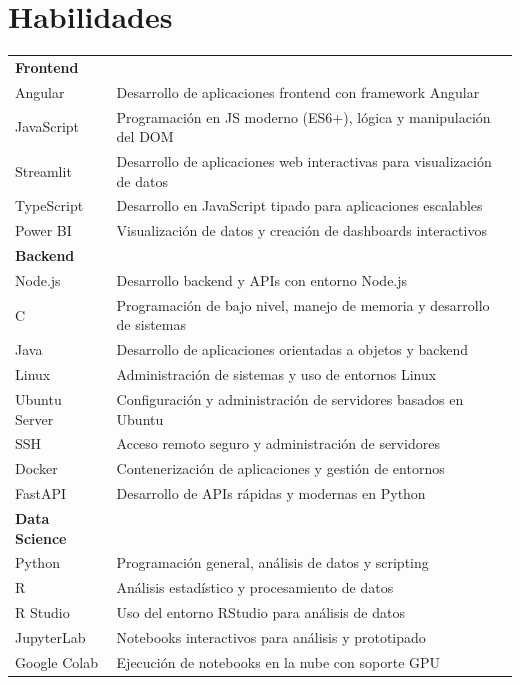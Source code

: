 \documentclass[a4paper,12pt]{article}
\begin{document}
\section{Habilidades}
\begin{tabularx}{\linewidth}{@{}l X@{}}

\textbf{Frontend} \\
Angular & \normalsize{Desarrollo de aplicaciones frontend con framework Angular}\\
JavaScript & \normalsize{Programación en JS moderno (ES6+), lógica y manipulación del DOM}\\
Streamlit & \normalsize{Desarrollo de aplicaciones web interactivas para visualización de datos}\\
TypeScript & \normalsize{Desarrollo en JavaScript tipado para aplicaciones escalables}\\
Power BI & \normalsize{Visualización de datos y creación de dashboards interactivos}\\

\textbf{Backend} \\
Node.js & \normalsize{Desarrollo backend y APIs con entorno Node.js}\\
C & \normalsize{Programación de bajo nivel, manejo de memoria y desarrollo de sistemas}\\
Java & \normalsize{Desarrollo de aplicaciones orientadas a objetos y backend}\\
Linux & \normalsize{Administración de sistemas y uso de entornos Linux}\\
Ubuntu Server & \normalsize{Configuración y administración de servidores basados en Ubuntu}\\
SSH & \normalsize{Acceso remoto seguro y administración de servidores}\\
Docker & \normalsize{Contenerización de aplicaciones y gestión de entornos}\\
FastAPI & \normalsize{Desarrollo de APIs rápidas y modernas en Python}\\

\textbf{Data Science} \\
Python & \normalsize{Programación general, análisis de datos y scripting}\\
R & \normalsize{Análisis estadístico y procesamiento de datos}\\
R Studio & \normalsize{Uso del entorno RStudio para análisis de datos}\\
JupyterLab & \normalsize{Notebooks interactivos para análisis y prototipado}\\
Google Colab & \normalsize{Ejecución de notebooks en la nube con soporte GPU}\\


\end{tabularx}
\end{document}
